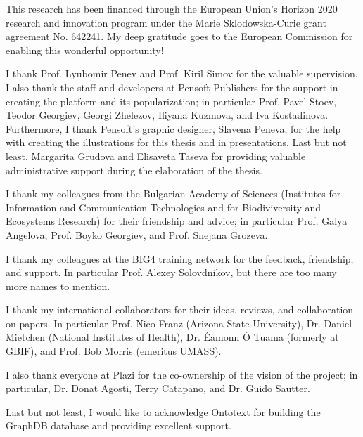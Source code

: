 \begin{acknowledgements}
\addchaptertocentry{\acknowledgementname} %

This research has been financed through the European Union’s Horizon 2020 research and innovation program under the Marie Sklodowska-Curie grant agreement No. 642241. My deep gratitude goes to the European Commission for enabling this wonderful opportunity!

\vspace{5mm}

I thank Prof. Lyubomir Penev and Prof. Kiril Simov for the valuable supervision. I also thank the staff and developers at Pensoft Publishers for the support in creating the platform and its popularization; in particular Prof. Pavel Stoev, Teodor Georgiev, Georgi Zhelezov, Iliyana Kuzmova, and Iva Kostadinova. Furthermore, I thank Pensoft's graphic designer, Slavena Peneva, for the help with creating the illustrations for this thesis and in presentations. Last but not least, Margarita Grudova and Elisaveta Taseva for providing valuable administrative support during the elaboration of the thesis.

\vspace{5mm}

I thank my colleagues from the Bulgarian Academy of Sciences (Institutes for Information and Communication Technologies and for Biodiviversity and Ecosystems Research) for their friendship and advice; in particular Prof. Galya Angelova, Prof. Boyko Georgiev, and Prof. Snejana Grozeva.

\vspace{5mm}

I thank my colleagues at the BIG4 training network for the feedback, friendship, and support. In particular Prof. Alexey Solovdnikov, but there are too many more names to mention.

\vspace{5mm}

I thank my international collaborators for their ideas, reviews, and collaboration on papers. In particular Prof. Nico Franz (Arizona State University), Dr. Daniel Mietchen (National Institutes of Health), Dr.  Éamonn Ó Tuama (formerly at GBIF), and Prof. Bob Morris (emeritus UMASS).

\vspace{5mm}

I also thank everyone at Plazi for the co-ownership of the vision of the project; in particular, Dr. Donat Agosti, Terry Catapano, and Dr. Guido Sautter.

\vspace{5mm}

Last but not least, I would like to acknowledge Ontotext for building the GraphDB database and providing excellent support.



\end{acknowledgements}